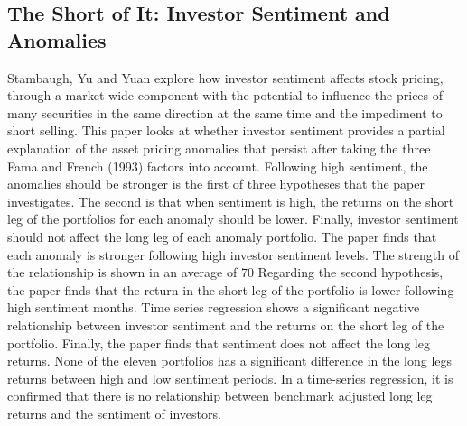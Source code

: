 \documentclass[a4paper,12pt]{article}                 %
\begin{document}
\subsection{The Short of It: Investor Sentiment and Anomalies}
Stambaugh, Yu and Yuan explore how investor sentiment affects stock pricing, through a market-wide component with the potential to influence the prices of many securities in the same direction at the same time and the impediment to short selling. This paper looks at whether investor sentiment provides a partial explanation of the asset pricing anomalies that persist after taking the three Fama and French (1993) factors into account.
Following high sentiment, the anomalies should be stronger is the first of three hypotheses that the paper investigates. The second is that when sentiment is high, the returns on the short leg of the portfolios for each anomaly should be lower. Finally, investor sentiment should not affect the long leg of each anomaly portfolio. 
The paper finds that each anomaly is stronger following high investor sentiment levels. The strength of the relationship is shown in an average of 70%
Regarding the second hypothesis, the paper finds that the return in the short leg of the portfolio is lower following high sentiment months. Time series regression shows a significant negative relationship between investor sentiment and the returns on the short leg of the portfolio.
Finally, the paper finds that sentiment does not affect the long leg returns. None of the eleven portfolios has a significant difference in the long legs returns between high and low sentiment periods. In a time-series regression, it is confirmed that there is no relationship between benchmark adjusted long leg returns and the sentiment of investors.
\end{document}
